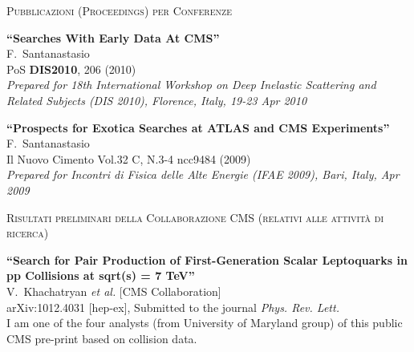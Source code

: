 \documentclass[10pt, a4paper]{article}
\begin{document}
\begin{thebibliography}{599}
\vspace{0.1cm} \begin{center} \textsc{Pubblicazioni (Proceedings) per Conferenze} \end{center} \vspace{0.05cm}

{\bf ``Searches With Early Data At CMS''}
  \\{}F.~Santanastasio
  \\{}PoS {\bf DIS2010}, 206 (2010)
\\{}{\it Prepared for 18th International Workshop on Deep Inelastic Scattering and Related Subjects (DIS 2010), Florence, Italy, 19-23 Apr 2010}

{\bf ``Prospects for Exotica Searches at ATLAS and CMS Experiments''}
  \\{}F.~Santanastasio
  \\{}Il Nuovo Cimento Vol.32 C, N.3-4 ncc9484 (2009)
\\{}{\it Prepared for Incontri di Fisica delle Alte Energie (IFAE 2009), Bari, Italy, Apr 2009}

\vspace{0.1cm} \begin{center} \textsc{Risultati preliminari della Collaborazione CMS (relativi alle attivit\`a di ricerca)} \end{center} \vspace{0.05cm}

{\bf ``Search for Pair Production of First-Generation Scalar Leptoquarks in pp Collisions at sqrt(s) = 7 TeV''}
  \\{}V.~Khachatryan {\it et al.}  [CMS Collaboration]
  \\{}arXiv:1012.4031 [hep-ex], Submitted to the journal {\it Phys. Rev. Lett.}
  \\I am one of the four analysts (from University of Maryland group) of this public CMS pre-print based on collision data.


\end{thebibliography}
\end{document}
